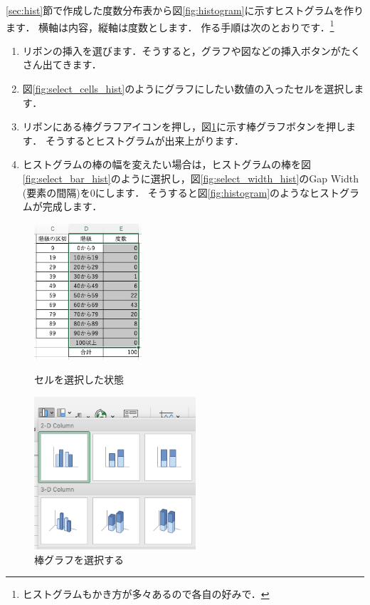 \ref{sec:hist}節で作成した度数分布表から図\ref{fig:histogram}に示すヒストグラムを作ります．
横軸は内容，縦軸は度数とします．
作る手順は次のとおりです．\footnote{ヒストグラムもかき方が多々あるので各自の好みで．}

\begin{enumerate}
    \item リボンの挿入を選びます．そうすると，グラフや図などの挿入ボタンがたくさん出てきます．
    \item 図\ref{fig:select_cells_hist}のようにグラフにしたい数値の入ったセルを選択します．
    \item リボンにある棒グラフアイコンを押し，図\ref{fig:select_barchart_hist}に示す棒グラフボタンを押します．
    そうするとヒストグラムが出来上がります．
    \item ヒストグラムの棒の幅を変えたい場合は，ヒストグラムの棒を図\ref{fig:select_bar_hist}のように選択し，図\ref{fig:select_width_hist}のGap Width (要素の間隔)を0にします．
    そうすると図\ref{fig:histogram}のようなヒストグラムが完成します．
\end{enumerate}

\begin{figure}[htbp]
    \begin{minipage}{0.5\hsize}
        \centering
  \includegraphics[width=4cm]{chap1/select_cells_hist.png}
  \caption{セルを選択した状態}
  \label{fig:select_cells_hist}
 \end{minipage}
 \begin{minipage}{0.5\hsize}
        \centering
  \includegraphics[width=6cm]{chap1/select_barchart_hist.png}
  \caption{棒グラフを選択する}
  \label{fig:select_barchart_hist}
 \end{minipage}
\end{figure}

